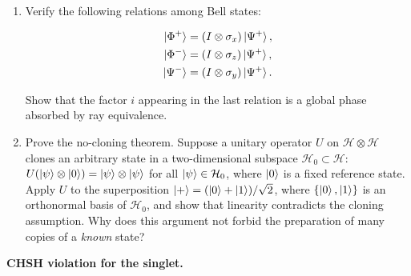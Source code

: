 \begin{problemset}
\begin{enumerate}
\item[(a)] Verify the following relations among Bell states:
\begin{linenomath}
\begin{align}
\ket{\Phi^+} &= (I \otimes \sigma_x)\ket{\Psi^+}, \\
\ket{\Phi^-} &= (I \otimes \sigma_z)\ket{\Psi^+}, \\
\ket{\Psi^-} &= (I \otimes \sigma_y)\ket{\Psi^+}.
\end{align}
\end{linenomath}
Show that the factor $i$ appearing in the last relation is a global phase absorbed by ray equivalence.
\item[(b)] Prove the no-cloning theorem. Suppose a unitary operator $U$ on $\mathcal{H} \otimes \mathcal{H}$ clones an arbitrary state in a two-dimensional subspace $\mathcal{H}_0 \subset \mathcal{H}$: $U(\ket{\psi} \otimes \ket{0}) = \ket{\psi} \otimes \ket{\psi}$ for all $\ket{\psi} \in \mathcal{H}_0$, where $\ket{0}$ is a fixed reference state. Apply $U$ to the superposition $\ket{+} = (\ket{0} + \ket{1})/\sqrt{2}$, where $\{\ket{0}, \ket{1}\}$ is an orthonormal basis of $\mathcal{H}_0$, and show that linearity contradicts the cloning assumption. Why does this argument not forbid the preparation of many copies of a \textit{known} state?
\end{enumerate}

\item[Exercise 7.5] \textbf{CHSH violation for the singlet.}
\label{item:ex-chsh}


\end{problemset}
